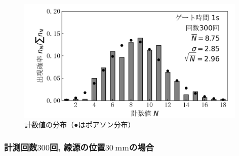 \documentclass{jarticle}
\begin{document}
\begin{figure}[H]
  \begin{center}
    \includegraphics[width=110mm]{graph/count-distribution-60mm-300times.png}
    \caption{計数値の分布（●はポアソン分布）}
    \label{fg:count-distribution-60mm-300times}
  \end{center}
\end{figure}


\subsubsection{計測回数$300$回, 線源の位置$30\ \mathrm{mm}$の場合}

\end{document}
